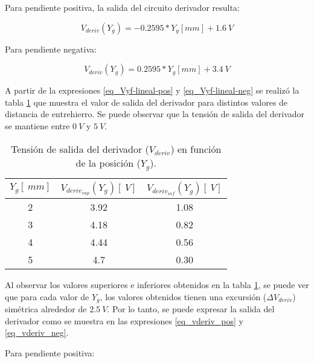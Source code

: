 
Para pendiente positiva, la salida del circuito derivador resulta:

\begin{equation} \label{eq_Vyf-lineal-pos}
	V_{deriv}(Y_g) = -0.2595*Y_g[mm] + 1.6\:V
\end{equation}


Para pendiente negativa:

\begin{equation} \label{eq_Vyf-lineal-neg}
	V_{deriv}(Y_g) = 0.2595*Y_g[mm] + 3.4\:V
\end{equation}


A partir de la expresiones \ref{eq_Vyf-lineal-pos} y \ref{eq_Vyf-lineal-neg} se realizó la tabla \ref{tab_Vyf_vs_y} que muestra el valor de salida del derivador para distintos valores de distancia de entrehierro. Se puede observar que la tensión de salida del derivador se mantiene entre $0\:V$ y $5\:V$.

\begin{table}[H]
	\begin{center}
		\begin{tabular}{| c | c | c |}
			\hline
			$Y_g[\:mm]$ & $V_{deriv_{sup}}(Y_g) [\:V]$ & $V_{deriv_{inf}}(Y_g) [\:V]$
			\\ \hline
			2 & 3.92 & 1.08\\ \hline 
			3 & 4.18 & 0.82\\ \hline 
			4 & 4.44 & 0.56\\ \hline 
			5 & 4.7  & 0.30\\ \hline 
		\end{tabular}
		\caption{Tensión de salida del derivador ($V_{deriv}$) en función de la posición ($Y_g$).}
		\label{tab_Vyf_vs_y}
	\end{center}
\end{table}

Al observar los valores superiores e inferiores obtenidos en la tabla \ref{tab_Vyf_vs_y}, se puede ver que para cada valor de $Y_g$, los valores obtenidos tienen una excursión ($\Delta V_{deriv}$) simétrica alrededor de $2.5\:V$. Por lo tanto, se puede expresar la salida del derivador como se muestra en las expresiones \ref{eq_vderiv_pos} y \ref{eq_vderiv_neg}.

Para pendiente positiva:

